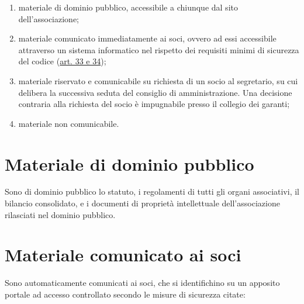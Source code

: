 \begin{enumerate}
    \item
        materiale di dominio pubblico, accessibile a chiunque dal sito
        dell'associazione;
    \item
        materiale comunicato immediatamente ai soci, ovvero ad essi
        accessibile attraverso un sistema informatico nel rispetto dei
        requisiti minimi di sicurezza del codice
        (\href{http://www.garanteprivacy.it/web/guest/home/docweb/-/docweb-display/docweb/1311248}{art.
        33 e 34});
    \item
        materiale riservato e comunicabile su richiesta di un socio al
        segretario, su cui delibera la successiva seduta del consiglio di
        amministrazione. Una decisione contraria alla richiesta del socio è
        impugnabile presso il collegio dei garanti;
    \item
        materiale non comunicabile.
\end{enumerate}

\section{Materiale di dominio pubblico}\label{materiale-di-dominio-pubblico}

Sono di dominio pubblico lo statuto, i regolamenti di tutti gli organi
associativi, il bilancio consolidato, e i documenti di proprietà
intellettuale dell'associazione rilasciati nel dominio pubblico.

\section{Materiale comunicato ai soci}\label{materiale-comunicato-ai-soci}

Sono automaticamente comunicati ai soci, che si identifichino su un apposito portale ad
accesso controllato secondo le misure di sicurezza citate:

